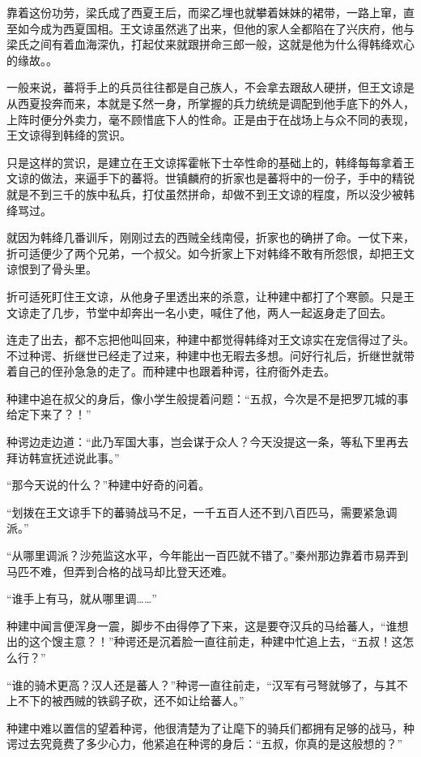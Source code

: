 靠着这份功劳，梁氏成了西夏王后，而梁乙埋也就攀着妹妹的裙带，一路上窜，直至如今成为西夏国相。王文谅虽然逃了出来，但他的家人全都陷在了兴庆府，他与梁氏之间有着血海深仇，打起仗来就跟拼命三郎一般，这就是他为什么得韩绛欢心的缘故。。

一般来说，蕃将手上的兵员往往都是自己族人，不会拿去跟敌人硬拼，但王文谅是从西夏投奔而来，本就是孓然一身，所掌握的兵力统统是调配到他手底下的外人，上阵时便分外卖力，毫不顾惜底下人的性命。正是由于在战场上与众不同的表现，王文谅得到韩绛的赏识。

只是这样的赏识，是建立在王文谅挥霍帐下士卒性命的基础上的，韩绛每每拿着王文谅的做法，来逼手下的蕃将。世镇麟府的折家也是蕃将中的一份子，手中的精锐就是不到三千的族中私兵，打仗虽然拼命，却做不到王文谅的程度，所以没少被韩绛骂过。

就因为韩绛几番训斥，刚刚过去的西贼全线南侵，折家也的确拼了命。一仗下来，折可适便少了两个兄弟，一个叔父。如今折家上下对韩绛不敢有所怨恨，却把王文谅恨到了骨头里。

折可适死盯住王文谅，从他身子里透出来的杀意，让种建中都打了个寒颤。只是王文谅走了几步，节堂中却奔出一名小吏，喊住了他，两人一起返身走了回去。

连走了出去，都不忘把他叫回来，种建中都觉得韩绛对王文谅实在宠信得过了头。不过种谔、折继世已经走了过来，种建中也无暇去多想。问好行礼后，折继世就带着自己的侄孙急急的走了。而种建中也跟着种谔，往府衙外走去。

种建中追在叔父的身后，像小学生般提着问题：“五叔，今次是不是把罗兀城的事给定下来了？！”

种谔边走边道：“此乃军国大事，岂会谋于众人？今天没提这一条，等私下里再去拜访韩宣抚述说此事。”

“那今天说的什么？”种建中好奇的问着。

“划拨在王文谅手下的蕃骑战马不足，一千五百人还不到八百匹马，需要紧急调派。”

“从哪里调派？沙苑监这水平，今年能出一百匹就不错了。”秦州那边靠着市易弄到马匹不难，但弄到合格的战马却比登天还难。

“谁手上有马，就从哪里调……”

种建中闻言便浑身一震，脚步不由得停了下来，这是要夺汉兵的马给蕃人，“谁想出的这个馊主意？！”种谔还是沉着脸一直往前走，种建中忙追上去，“五叔！这怎么行？”

“谁的骑术更高？汉人还是蕃人？”种谔一直往前走，“汉军有弓弩就够了，与其不上不下的被西贼的铁鹞子砍，还不如让给蕃人。”

种建中难以置信的望着种谔，他很清楚为了让麾下的骑兵们都拥有足够的战马，种谔过去究竟费了多少心力，他紧追在种谔的身后：“五叔，你真的是这般想的？”

